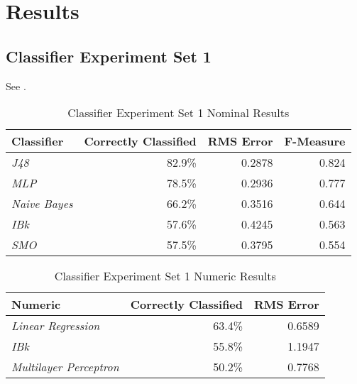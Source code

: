 \documentclass[../thesis/thesis.tex]{subfiles}
\begin{document}
 \chapter{Results}

 \section{Classifier Experiment Set 1}
 See .

\begin{table}
\centering
\begin{tabular}{|l|r|r|r|}
\hline
\textbf{Classifier}  & \textbf{Correctly Classified} & \textbf{RMS Error} & \textbf{F-Measure} \\ \hline
\textit{J48}         & 82.9\%                        & 0.2878             & 0.824              \\ \hline
\textit{MLP}         & 78.5\%                        & 0.2936             & 0.777              \\ \hline
\textit{Naive Bayes} & 66.2\%                        & 0.3516             & 0.644              \\ \hline
\textit{IBk}         & 57.6\%                        & 0.4245             & 0.563              \\ \hline
\textit{SMO}         & 57.5\%                        & 0.3795             & 0.554              \\ \hline
\end{tabular}
\caption{Classifier Experiment Set 1 Nominal Results}
\end{table}

\begin{table}
\centering
\begin{tabular}{|l|r|r|}
\hline
\textbf{Numeric}               & \textbf{Correctly Classified} & \textbf{RMS Error} \\ \hline
\textit{Linear Regression}     & 63.4\%                        & 0.6589             \\ \hline
\textit{IBk}                   & 55.8\%                        & 1.1947             \\ \hline
\textit{Multilayer Perceptron} & 50.2\%                        & 0.7768             \\ \hline
\end{tabular}
\caption{Classifier Experiment Set 1 Numeric Results}
\end{table}

\end{document}
